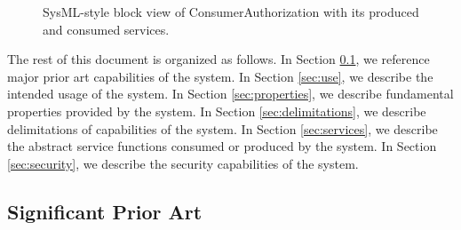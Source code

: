 \documentclass[a4paper]{arrowhead}
\begin{document}
\begin{figure}[ht!]
  \centering
  \caption{SysML-style block view of ConsumerAuthorization with its produced and consumed services.}
  \label{fig:system}
\end{figure}

The rest of this document is organized as follows.
In Section \ref{sec:prior_art}, we reference major prior art capabilities of the system.
In Section \ref{sec:use}, we describe the intended usage of the system.
In Section \ref{sec:properties}, we describe fundamental properties provided by the system.
In Section \ref{sec:delimitations}, we describe delimitations of capabilities of the system.
In Section \ref{sec:services}, we describe the abstract service functions consumed or produced by the system.
In Section \ref{sec:security}, we describe the security capabilities of the system.

\newpage

\subsection{Significant Prior Art}
\label{sec:prior_art}
\end{document}
